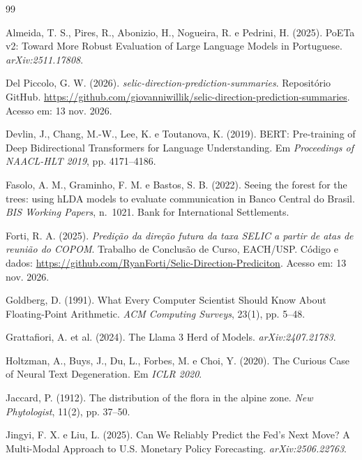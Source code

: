 \documentclass[12pt]{article}
\begin{document}
\begin{thebibliography}{99}

Almeida, T. S., Pires, R., Abonizio, H., Nogueira, R. e Pedrini, H. (2025).
PoETa v2: Toward More Robust Evaluation of Large Language Models in
Portuguese. \textit{arXiv:2511.17808}.

Del Piccolo, G. W. (2026). \textit{selic-direction-prediction-summaries}.
Repositório GitHub.
\url{https://github.com/giovanniwillik/selic-direction-prediction-summaries}.
Acesso em: 13 nov. 2026.

Devlin, J., Chang, M.-W., Lee, K. e Toutanova, K. (2019). BERT: Pre-training of
Deep Bidirectional Transformers for Language Understanding. Em
\textit{Proceedings of NAACL-HLT 2019}, pp. 4171--4186.

Fasolo, A. M., Graminho, F. M. e Bastos, S. B. (2022). Seeing the forest for the
trees: using hLDA models to evaluate communication in Banco Central do Brasil.
\textit{BIS Working Papers}, n.~1021. Bank for International Settlements.

Forti, R. A. (2025). \textit{Predição da direção futura da taxa SELIC a partir
de atas de reunião do COPOM}. Trabalho de Conclusão de Curso, EACH/USP. Código e
dados: \url{https://github.com/RyanForti/Selic-Direction-Prediciton}. Acesso em:
13 nov. 2026.

Goldberg, D. (1991). What Every Computer Scientist Should Know About
Floating-Point Arithmetic. \textit{ACM Computing Surveys}, 23(1), pp. 5--48.

Grattafiori, A. et al. (2024). The Llama 3 Herd of Models.
\textit{arXiv:2407.21783}.

Holtzman, A., Buys, J., Du, L., Forbes, M. e Choi, Y. (2020). The Curious Case
of Neural Text Degeneration. Em \textit{ICLR 2020}.

Jaccard, P. (1912). The distribution of the flora in the alpine zone.
\textit{New Phytologist}, 11(2), pp. 37--50.

Jingyi, F. X. e Liu, L. (2025). Can We Reliably Predict the Fed's Next Move? A
Multi-Modal Approach to U.S. Monetary Policy Forecasting.
\textit{arXiv:2506.22763}.


\end{thebibliography}
\end{document}
